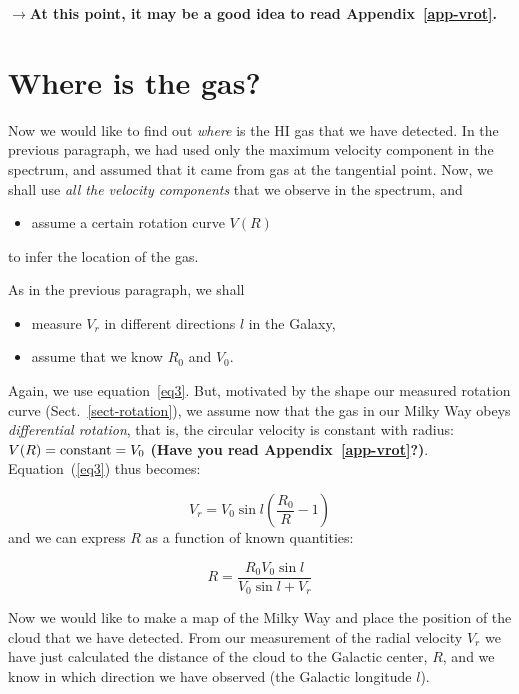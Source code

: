{\bf{$\rightarrow$}{At this point, it may be a good idea to read Appendix~\ref{app-vrot}.}}

\section{Where is the gas?}
\label{secmap}

Now we would like to find out {\em where} is the HI gas that we have detected. 
In the previous paragraph, we had used only the maximum velocity component in the spectrum, 
and assumed that it came from gas at 
the tangential point. 
Now, we shall use 
{\em all the velocity components} that we observe in the spectrum, and 
\begin{itemize}
\item{assume a certain rotation curve $V(R)$}
\end{itemize}

to infer the location of the gas. 

As in the previous paragraph, we shall 
\begin{itemize}
\item{measure $V_r$ in different directions $l$ in the Galaxy},  
\item{assume that we know $R_0$ and $V_0$.} 
\end{itemize}

Again, we use equation~\ref{eq3}. 
But, motivated by the shape our measured rotation curve (Sect.~\ref{sect-rotation}),  
we assume now that the gas in our Milky Way 
obeys {\em differential rotation}, that is, the circular velocity is
constant with radius: $V(R) = {\rm constant} = V_0$
{\bf{(Have you read Appendix~\ref{app-vrot}?)}}. 
Equation~(\ref{eq3}) thus becomes:

\begin{equation}
V_r = V_0\sin l \left( \frac{R_0}{R} -1 \right) 
\end{equation}
and we can express $R$ as a function of known quantities: 

\begin{equation}
\boxed{
R = \frac{R_0 V_0 \sin l}{V_0 \sin l + V_r} 
}
\label{Req}
\end{equation}

Now we would like to make a map of the Milky Way and place the
position of the cloud that we have detected.  From our measurement of
the radial velocity $V_r$ we have just calculated the distance of the
cloud to the Galactic center, $R$, and we know in which direction we
have observed (the Galactic longitude $l$).  


